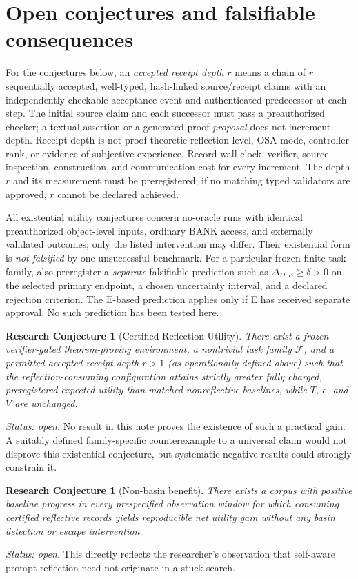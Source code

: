\documentclass[11pt,letterpaper]{article}
\newtheorem{conjecture}[definition]{Research Conjecture}
\begin{document}
\section{Open conjectures and falsifiable consequences}
For the conjectures below, an \emph{accepted receipt depth} $r$ means a chain of $r$ sequentially accepted, well-typed, hash-linked source/receipt claims with an independently checkable acceptance event and authenticated predecessor at each step. The initial source claim and each successor must pass a preauthorized checker; a textual assertion or a generated proof \emph{proposal} does not increment depth. Receipt depth is not proof-theoretic reflection level, OSA mode, controller rank, or evidence of subjective experience. Record wall-clock, verifier, source-inspection, construction, and communication cost for every increment. The depth $r$ and its measurement must be preregistered; if no matching typed validators are approved, $r$ cannot be declared achieved.

All existential utility conjectures concern no-oracle runs with identical preauthorized object-level inputs, ordinary BANK access, and externally validated outcomes; only the listed intervention may differ. Their existential form is \emph{not falsified} by one unsuccessful benchmark. For a particular frozen finite task family, also preregister a \emph{separate} falsifiable prediction such as $\Delta_{D,E}\ge\delta>0$ on the selected primary endpoint, a chosen uncertainty interval, and a declared rejection criterion. The E-based prediction applies only if E has received separate approval. No such prediction has been tested here.

\begin{conjecture}[Certified Reflection Utility]\label{conj:utility}
There exist a frozen verifier-gated theorem-proving environment, a nontrivial task family $\mathcal F$, and a permitted \emph{accepted receipt depth} $r>1$ (as operationally defined above) such that the reflection-consuming configuration attains strictly greater \emph{fully charged, preregistered} expected utility than matched nonreflective baselines, while $T$, $c$, and $V$ are unchanged.
\end{conjecture}
\emph{Status: open.} No result in this note proves the existence of such a practical gain. A suitably defined family-specific counterexample to a universal claim would not disprove this existential conjecture, but systematic negative results could strongly constrain it.

\begin{conjecture}[Non-basin benefit]
There exists a corpus with positive baseline progress in every prespecified observation window for which consuming certified reflective records yields reproducible net utility gain without any basin detection or escape intervention.
\end{conjecture}
\emph{Status: open.} This directly reflects the researcher's observation that self-aware prompt reflection need not originate in a stuck search.
\end{document}
